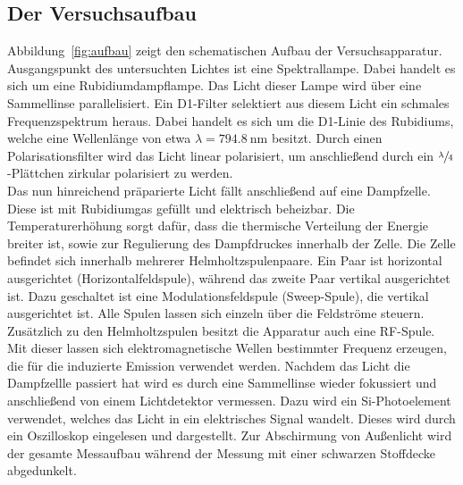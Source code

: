 \documentclass[
  bibliography=totoc,     %
  captions=tableheading,  %
  titlepage=firstiscover, %
]{scrartcl}
\begin{document}
\subsection{Der Versuchsaufbau}
Abbildung~\ref{fig:aufbau} zeigt den schematischen Aufbau der Versuchsapparatur.
Ausgangspunkt des untersuchten Lichtes ist eine Spektrallampe. Dabei handelt es
sich um eine Rubidiumdampflampe. Das Licht dieser Lampe wird über eine
Sammellinse parallelisiert. Ein D1-Filter selektiert aus diesem
Licht ein schmales Frequenzspektrum heraus. Dabei handelt es sich um die
D1-Linie des Rubidiums, welche eine Wellenlänge von etwa
$\lambda=\SI{794.8}{\nano\metre}$ besitzt. Durch einen Polarisationsfilter
wird das Licht linear polarisiert, um anschließend durch ein
$\sfrac{\lambda}{4}$-Plättchen zirkular polarisiert zu werden. \\
Das nun hinreichend präparierte Licht fällt anschließend auf eine Dampfzelle.
Diese ist mit Rubidiumgas gefüllt und elektrisch beheizbar. Die Temperaturerhöhung
sorgt dafür, dass die thermische Verteilung der Energie breiter ist, sowie zur
Regulierung des Dampfdruckes innerhalb der Zelle. Die Zelle befindet sich
innerhalb mehrerer Helmholtzspulenpaare. Ein Paar ist horizontal ausgerichtet
(Horizontalfeldspule), während das zweite Paar vertikal ausgerichtet ist. Dazu
geschaltet ist eine Modulationsfeldspule (Sweep-Spule), die vertikal ausgerichtet
ist. Alle Spulen lassen sich
einzeln über die Feldströme steuern. Zusätzlich zu den Helmholtzspulen besitzt
die Apparatur auch eine RF-Spule. Mit dieser lassen sich elektromagnetische Wellen
bestimmter Frequenz erzeugen, die für die induzierte Emission verwendet werden.
Nachdem das Licht die Dampfzellle passiert hat wird es durch eine Sammellinse
wieder fokussiert und anschließend von einem Lichtdetektor vermessen.
Dazu wird ein Si-Photoelement verwendet, welches das Licht in ein elektrisches
Signal wandelt. Dieses wird durch ein Oszilloskop eingelesen und dargestellt.
Zur Abschirmung von Außenlicht wird der gesamte Messaufbau während der Messung
mit einer schwarzen Stoffdecke abgedunkelt.
\end{document}
